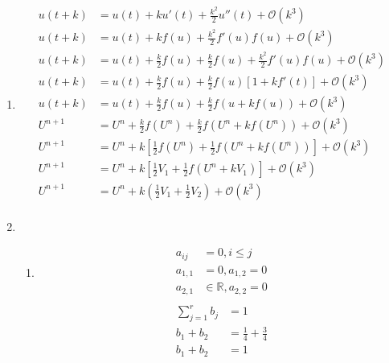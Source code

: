 \documentclass{article}
\begin{document}

\begin{enumerate}

\item 
	\begin{equation*}
	\begin{split}
	u(t+k) & = u(t)+ku'(t)+ \frac{k^{2}}{2} u''(t) + \mathcal{O}(k^{3}) \\
	u(t+k) & = u(t)+kf(u)+ \frac{k^{2}}{2} f'(u)f(u) + \mathcal{O}(k^{3}) \\
	u(t+k) & = u(t)+\frac{k}{2}f(u)+\frac{k}{2}f(u)+ \frac{k^{2}}{2} f'(u)f(u) + \mathcal{O}(k^{3}) \\
	u(t+k) & = u(t) + \frac{k}{2}f(u)+\frac{k}{2}f(u)[ 1+ kf'(t)] + \mathcal{O}(k^{3}) \\
	u(t+k) & = u(t)  + \frac{k}{2}f(u) +  \frac{k}{2}f(u + kf(u)) + \mathcal{O}(k^{3}) \\
	U^{n+1} & = U^{n} + \frac{k}{2}f( U^{n}) +\frac{k}{2}f(U^{n} + k f(U^{n})) + \mathcal{O}(k^{3}) \\
	U^{n+1} & = U^{n} + k[\frac{1}{2}f( U^{n}) +\frac{1}{2}f(U^{n} + k f(U^{n}))] + \mathcal{O}(k^{3}) \\
	U^{n+1} & = U^{n} + k[ \frac{1}{2}V_{1} +\frac{1}{2}f(U^{n} + k V_{1})] + \mathcal{O}(k^{3}) \\
	U^{n+1} & = U^{n} + k( \frac{1}{2}V_{1} +\frac{1}{2} V_{2}) + \mathcal{O}(k^{3}) \\
	\end{split}
	\end{equation*}
\item
	\begin{enumerate}
	\item
		\begin{equation*}
		\begin{split}
		a_{ij} & = 0, i \leq j\\
		a_{1,1} &= 0, a_{1,2} = 0 \\
		a_{2,1} & \in \mathbb{R}, a_{2,2} = 0 \\
		\end{split}
		\end{equation*}
		\begin{equation*}
		\begin{split}
		\sum_{j=1}^{r} b_{j} & = 1 \\
		b_{1}+b_{2} & = \frac{1}{4}+\frac{3}{4} \\
		b_{1} +b_{2} & = 1\\

\end{split}
\end{equation*}
\end{enumerate}
\end{enumerate}
\end{document}
